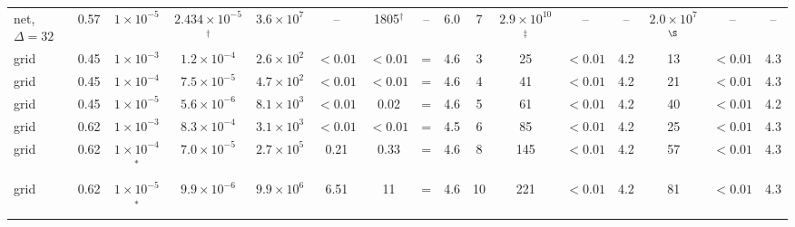 \begin{table}[t]
\begin{ruledtabular}
\begin{tabular}{lcc|cccccc|cccc|ccc}
net, $\Delta=32$ & 0.57 & $1\times10^{-5}$ & $2.434\times10^{-5}$$^{\dagger}$ & $3.6\times10^{7}$ & -- & 1805$^{\dagger}$ & -- & 6.0 & 7 & $2.9\times10^{10}$$^{\ddagger}$ & -- & -- & $2.0\times10^{7}$$^{\S}$ & -- & -- \\
grid & 0.45 & $1\times10^{-3}$ & $1.2\times10^{-4}$ & $2.6\times10^{2}$ & $<0.01$ & $<0.01$ & = & 4.6 & 3 & 25 & $<0.01$ & 4.2 & 13 & $<0.01$ & 4.3 \\
grid & 0.45 & $1\times10^{-4}$ & $7.5\times10^{-5}$ & $4.7\times10^{2}$ & $<0.01$ & $<0.01$ & = & 4.6 & 4 & 41 & $<0.01$ & 4.2 & 21 & $<0.01$ & 4.3 \\
grid & 0.45 & $1\times10^{-5}$ & $5.6\times10^{-6}$ & $8.1\times10^{3}$ & $<0.01$ & 0.02 & = & 4.6 & 5 & 61 & $<0.01$ & 4.2 & 40 & $<0.01$ & 4.2 \\
grid & 0.62 & $1\times10^{-3}$ & $8.3\times10^{-4}$ & $3.1\times10^{3}$ & $<0.01$ & $<0.01$ & = & 4.5 & 6 & 85 & $<0.01$ & 4.2 & 25 & $<0.01$ & 4.3 \\
grid & 0.62 & $1\times10^{-4}$$^*$ & $7.0\times10^{-5}$ & $2.7\times10^{5}$ & 0.21 & 0.33 & = & 4.6 & 8 & 145 & $<0.01$ & 4.2 & 57 & $<0.01$ & 4.3 \\
grid & 0.62 & $1\times10^{-5}$$^*$ & $9.9\times10^{-6}$ & $9.9\times10^{6}$ & 6.51 & 11 & = & 4.6 & 10 & 221 & $<0.01$ & 4.2 & 81 & $<0.01$ & 4.3 \\
\end{tabular}
\end{ruledtabular}
\end{table}
